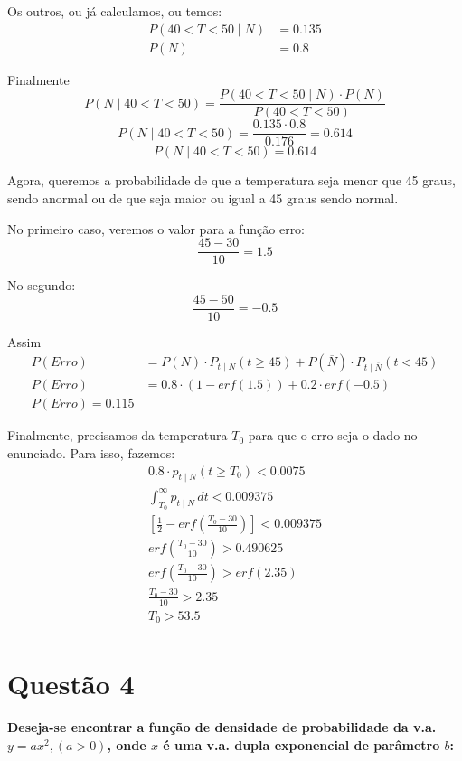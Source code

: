 \documentclass[a5paper]{report}
\begin{document}
Os outros, ou já calculamos, ou temos:
\begin{align*}
    P(40 < T < 50 \mid N) &= 0.135\\
    P(N) &= 0.8
\end{align*}

Finalmente
\[P(N \mid 40 < T < 50) = \frac{P(40 < T < 50 \mid N) \cdot P(N)}{P(40 < T < 50)}\]
\[P(N \mid 40 < T < 50) = \frac{0.135 \cdot 0.8}{0.176} = 0.614\]
\[\boxed{P(N \mid 40 < T < 50) = 0.614}\]

Agora, queremos a probabilidade de que a temperatura seja menor que 45 graus, sendo anormal ou de que seja maior ou igual a 45 graus sendo normal.

No primeiro caso, veremos o valor para a função erro:
\[\frac{45 - 30}{10} = 1.5\]

No segundo:
\[\frac{45 - 50}{10} = -0.5\]

Assim
\begin{align*}
    P(Erro) &= P(N) \cdot P_{t \mid N}(t \geq 45) + P(\overline{N}) \cdot P_{t \mid \overline{N}}(t < 45)\\
    P(Erro) &= 0.8 \cdot (1 - erf(1.5)) + 0.2 \cdot erf(-0.5)\\
    \boxed{P(Erro) = 0.115}
\end{align*}

Finalmente, precisamos da temperatura $T_0$ para que o erro seja o dado no enunciado. Para isso, fazemos:
\begin{align*}
    0.8 \cdot p_{t \mid N}(t \geq T_0) < 0.0075\\
    \int_{T_0}^{\infty} p_{t \mid N} \, dt < 0.009375\\
    \left[\frac{1}{2} - erf(\frac{T_0 - 30}{10})\right] < 0.009375\\
    erf\left(\frac{T_0 - 30}{10}\right) > 0.490625\\
    erf\left(\frac{T_0 - 30}{10}\right) > erf(2.35)\\
    \frac{T_0 - 30}{10} > 2.35\\
    \boxed{T_0 > 53.5}\\
\end{align*}

\section*{Questão 4}
\textbf{Deseja-se encontrar a função de densidade de probabilidade da v.a. $y = ax^2, (a > 0)$, onde $x$ é uma v.a. dupla exponencial de parâmetro $b$:}
\end{document}
